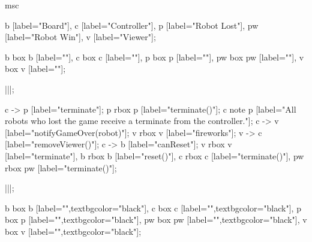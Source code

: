 \begin{msc}
msc
{

b [label="Board"],
c [label="Controller"],
p [label="Robot Lost"],
pw [label="Robot Win"],
v [label="Viewer"];

b box b [label=""],
c box c [label=""],
p box p [label=""],
pw box pw [label=""],
v box v [label=""];

|||;

c -> p [label="terminate"];
p rbox p [label="terminate()"];
c note p [label="All robots who lost the game receive a terminate from the controller."];
c -> v [label="notifyGameOver(robot)"];
v rbox v [label="fireworks"];
v -> c [label="removeViewer()"];
c -> b [label="canReset"];
v rbox v [label="terminate"],
b rbox b [label="reset()"],
c rbox c [label="terminate()"],
pw rbox pw [label="terminate()"];


|||;

b box b [label="",textbgcolor="black"],
c box c [label="",textbgcolor="black"],
p box p [label="",textbgcolor="black"],
pw box pw [label="",textbgcolor="black"],
v box v [label="",textbgcolor="black"];

}
\end{msc}
